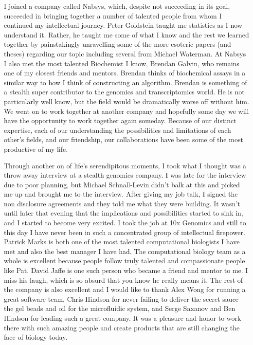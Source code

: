\begin{acknowledgements}
I joined a company called Nabsys, which, despite not succeeding in its goal, succeeded in bringing together a number of talented people from whom I continued my intellectual journey. Peter Goldstein taught me statistics as I now understand it. Rather, he taught me some of what I know and the rest we learned together by painstakingly unravelling some of the more esoteric papers (and theses) regarding our topic including several from Michael Waterman. At Nabsys I also met the most talented Biochemist I know, Brendan Galvin, who remains one of my closest friends and mentors. Brendan thinks of biochemical assays in a similar way to how I think of constructing an algorithm. Brendan is something of a stealth super contributor to the genomics and transcriptomics world. He is not particularly well know, but the field would be dramatically worse off without him. We went on to work together at another company and hopefully some day we will have the opportunity to work together again someday. Because of our distinct expertise, each of our understanding the possibilities and limitations of each other's fields, and our friendship, our collaborations have been some of the most productive of my life. 

Through another on of life's serendipitous moments, I took what I thought was a throw away interview at a stealth genomics company. I was late for the interview due to poor planning, but Michael Schnall-Levin didn't balk at this and picked me up and brought me to the interview. After giving my job talk, I signed the non disclosure agreements and they told me what they were building. It wasn't until later that evening that the implications and possibilities started to sink in, and I started to become very excited. I took the job at 10x Genomics and still to this day I have never been in such a concentrated group of intellectual firepower. Patrick Marks is both one of the most talented computational biologists I have met and also the best manager I have had. The computational biology team as a whole is excellent because people follow truly talented and compassionate people like Pat. David Jaffe is one such person who became a friend and mentor to me. I miss his laugh, which is so absurd that you know he really means it. The rest of the company is also excellent and I would like to thank Alex Wong for running a great software team, Chris Hindson for never failing to deliver the secret sauce -- the gel beads and oil for the microfluidic system, and Serge Saxanov and Ben Hindson for leading such a great company. It was a pleasure and honor to work there with such amazing people and create products that are still changing the face of biology today. 


\end{acknowledgements}

